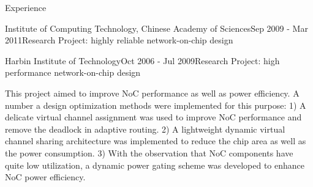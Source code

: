 \documentclass{resume} %
\begin{document}
\begin{rSection}{Experience}
\begin{rSubsection}{Institute of Computing Technology, Chinese Academy of Sciences}{Sep 2009 - Mar 2011}{Research Project: highly reliable network-on-chip design}{}
\end{rSubsection}


\begin{rSubsection}{Harbin Institute of Technology}{Oct 2006 - Jul 2009}{Research Project: high performance network-on-chip design}{}
\item This project aimed to improve NoC performance as well as power efficiency. A number a design
optimization methods were implemented for this purpose: 1) A delicate virtual channel assignment was
used to improve NoC performance and remove the deadlock in adaptive routing. 2) A lightweight
dynamic virtual channel sharing architecture was implemented to reduce the chip area as well as the
power consumption. 3) With the observation that NoC components have quite low utilization, a dynamic
power gating scheme was developed to enhance NoC power efficiency.
\end{rSubsection}

\end{rSection}
\end{document}
